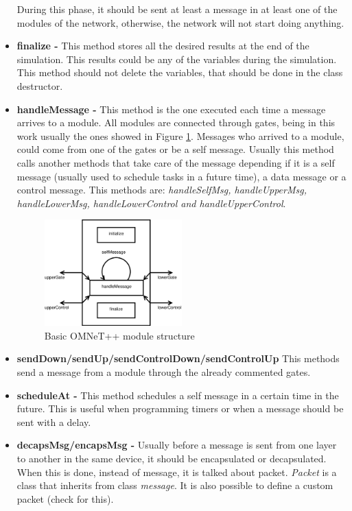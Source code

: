 \begin{itemize}
During this phase, it should be sent at least a message in at least one of the modules of the network, otherwise, the network will not start doing 
anything.
 \item \textbf{finalize - }This method stores all the desired results at the end of the simulation. This results could be any of the variables during the 
simulation. This method should not delete the variables, that should be done in the class destructor.
 \item \textbf{handleMessage - }This method is the one executed each time a message arrives to a module. All modules are connected through gates,
being in this work usually the ones showed in Figure \ref{fig:omnetmodule}. Messages who arrived to a module, could come from one of the gates or be a self
message. Usually this method calls another methods that take care of the message depending if it is a self message (usually used to schedule 
tasks in a future time), a data message or a control message. This methods are: \textit{handleSelfMsg, handleUpperMsg, handleLowerMsg, 
handleLowerControl and handleUpperControl}.
\begin{figure}[ht]
 \begin{center}
  \includegraphics[width=0.5\textwidth]{omnetmodule.eps}
 \end{center}
 \caption{Basic \ac{OMNeT++} module structure}
 \label{fig:omnetmodule}
\end{figure}
 \item \textbf{sendDown/sendUp/sendControlDown/sendControlUp }This methods send a message from a module through the already commented gates.
 \item \textbf{scheduleAt - }This method schedules a self message in a certain time in the future. This is useful when programming timers or when a
message should be sent with a delay.
 \item \textbf{decapsMsg/encapsMsg - }Usually before a message is sent from one layer to another in the same device, it should be encapsulated or 
decapsulated. When this is done, instead of message, it is talked about packet. \textit{Packet} is a class that inherits from class \textit{message}. It 
is also possible to define a custom packet (check \cite{manualomnet} for this).
\end{itemize}

